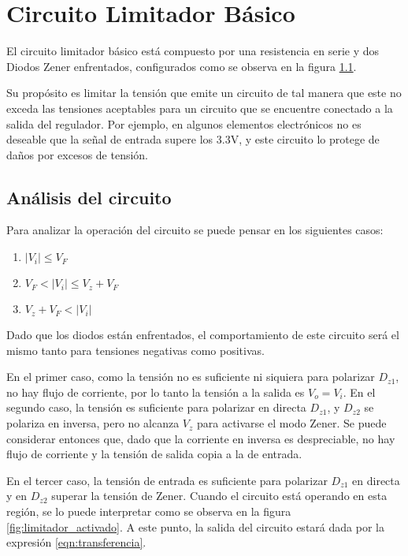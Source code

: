 \chapter{Circuito Limitador Básico}
El circuito limitador básico está compuesto por una resistencia en serie y dos Diodos Zener enfrentados, configurados como se observa en la figura \ref{fig:limitador_basico}.

Su propósito es limitar la tensión que emite un circuito de tal manera que este no exceda las tensiones aceptables para un circuito que se encuentre conectado a la salida del regulador. Por ejemplo, en algunos elementos electrónicos no es deseable que la señal de entrada supere los $3.3 \si{\volt}$, y este circuito lo protege de daños por excesos de tensión.

\begin{figure}[ht]
    \begin{center}
        
        \label{fig:limitador_basico}
    \end{center}
\end{figure}

\section{Análisis del circuito} \label{sec:limitador_analisis}
Para analizar la operación del circuito se puede pensar en los siguientes casos:

\begin{enumerate}
    \item $|V_i| \leq V_F$
    \item $V_F < |V_i| \leq V_z + V_F$
    \item $V_z + V_F < |V_i|$ 
\end{enumerate}

Dado que los diodos están enfrentados, el comportamiento de este circuito será el mismo tanto para tensiones negativas como positivas.

En el primer caso, como la tensión no es suficiente ni siquiera para polarizar $D_{z1}$, no hay flujo de corriente, por lo tanto la tensión a la salida es $V_o = V_i$. En el segundo caso, la tensión es suficiente para polarizar en directa $D_{z1}$, y $D_{z2}$ se polariza en inversa, pero no alcanza $V_z$ para activarse el modo Zener. Se puede considerar entonces que, dado que la corriente en inversa es despreciable, no hay flujo de corriente y la tensión de salida copia a la de entrada.

En el tercer caso, la tensión de entrada es suficiente para polarizar $D_{z1}$ en directa y en $D_{z2}$ superar la tensión de Zener. Cuando el circuito está operando en esta región, se lo puede interpretar como se observa en la figura \ref{fig:limitador_activado}. A este punto, la salida del circuito estará dada por la expresión \eqref{eqn:transferencia}.

